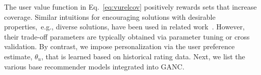 The user  value function in Eq.~\ref{eq:vurelcov} positively rewards  sets that increase coverage.  Similar intuitions for encouraging solutions with desirable properties,~e.g., diverse solutions, have been used in related work~\cite{ agrawal2009diversifying}. %
  However, their trade-off parameters  are typically obtained via parameter tuning or cross validation. By contrast, we impose personalization via the user preference estimate, $\theta_u$, that  is learned based on historical rating data. Next, we list the various base recommender models integrated into GANC.
 
\iffalse
Competitive Mixture of Experts :The accuracy recommender and the coverage recommender can be viewed as two experts, and  any of our risk measures can be used as a probabilistic switching indicator. Specifically,  the top-$\size$ set for a user is determined as follows:
\begin{enumerate}
\item With probability $1-\theta_u$ we choose the set suggested by the accuracy recommender, i.e., $v_u(\mathcal{P}_u) =   a(\mathcal{P}_{u}) $. 
\item With probability $\theta_u$ we suggest the top-$\size$ set suggested by the coverage recommender, i.e., $ v_u(\mathcal{P}_u) =   c(\mathcal{P}_{u})$.  
\end{enumerate} 
This model resolves scale issues between the two objective functions. 
\fi
 
